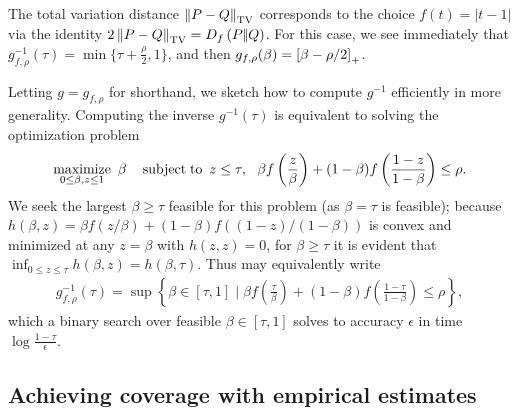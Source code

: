 \begin{example}
  \label{example:tv-distances}
  The total variation distance $\left\|{P - Q}\right\|_{\rm TV}$ corresponds
  to the choice $f(t) = |t - 1|$ via the identity
  $2 \left\|{P - Q}\right\|_{\rm TV} = D_{f}\left({P} |\!| {Q}\right)$. For this case, we see
  immediately that $g_{f,\rho}^{-1}(\tau) = \min\{\tau + \frac{\rho}{2},
  1\}$, and then $g_{f,\rho}(\beta) = \left[{\beta - \rho/2}\right]_+$.
\end{example}
\noindent
Letting $g = g_{f,\rho}$ for shorthand,
we sketch how to compute $g^{-1}$ efficiently in more generality.
Computing the inverse $g^{-1}(\tau)$ is equivalent to solving the
optimization problem
\begin{align*}
  \mathop{\rm maximize}_{0 \le \beta, z \le 1} ~ \beta
  ~~~ \mathop{\rm subject\;to} ~ z \le \tau, ~~
  \beta f\left(\frac{z}{\beta}\right) + (1 - \beta) f\left(\frac{1 - z}{
    1 - \beta}\right) \le \rho.
\end{align*}
We seek the largest $\beta \ge \tau$ feasible for this problem (as $\beta =
\tau$ is feasible); because $h(\beta, z) = \beta f(z/\beta) + (1 -
\beta) f((1 - z) / (1 - \beta))$ is convex and minimized at any $z = \beta$
with $h(z,z) = 0$,
for $\beta \ge \tau$ it is evident that
$\inf_{0 \le z \le \tau} h(\beta, z) = h(\beta, \tau)$. Thus
may equivalently write
\begin{align*}
  g^{-1}_{f,\rho}(\tau)
  = \sup\left\{\beta \in [\tau, 1] \mid
  \beta f\left(\frac{\tau}{\beta}\right) + (1 - \beta)
  f\left(\frac{1 - \tau}{1 - \beta}\right) \le \rho \right\},
\end{align*}
which a binary search over feasible $\beta \in [\tau, 1]$ solves
to accuracy $\epsilon$ in time $\log \frac{1 - \tau}{\epsilon}$.

\subsection{Achieving coverage with empirical estimates}
\label{sec:get-coverage-for-divs}

